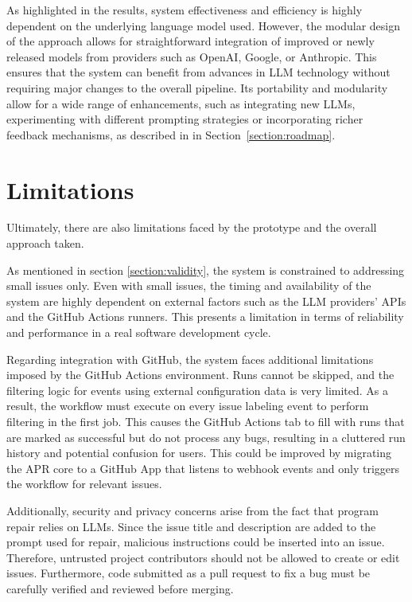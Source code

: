 As highlighted in the results, system effectiveness and efficiency is highly dependent on the underlying language model used. However, the modular design of the approach allows for straightforward integration of improved or newly released models from providers such as OpenAI, Google, or Anthropic. This ensures that the system can benefit from advances in \ac{LLM} technology without requiring major changes to the overall pipeline. Its portability and modularity allow for a wide range of enhancements, such as integrating new \acp{LLM}, experimenting with different prompting strategies or incorporating richer feedback mechanisms, as described in in Section~\ref{section:roadmap}.

\section{Limitations}
Ultimately, there are also limitations faced by the prototype and the overall approach taken.

As mentioned in section \ref{section:validity}, the system is constrained to addressing small issues only. Even with small issues, the timing and availability of the system are highly dependent on external factors such as the \ac{LLM} providers' APIs and the GitHub Actions runners. This presents a limitation in terms of reliability and performance in a real software development cycle.

Regarding integration with GitHub, the system faces additional limitations imposed by the GitHub Actions environment. Runs cannot be skipped, and the filtering logic for events using external configuration data is very limited. As a result, the workflow must execute on every issue labeling event to perform filtering in the first job. This causes the GitHub Actions tab to fill with runs that are marked as successful but do not process any bugs, resulting in a cluttered run history and potential confusion for users. This could be improved by migrating the APR core to a GitHub App that listens to webhook events and only triggers the workflow for relevant issues.

Additionally, security and privacy concerns arise from the fact that program repair relies on \acp{LLM}. Since the issue title and description are added to the prompt used for repair, malicious instructions could be inserted into an issue. Therefore, untrusted project contributors should not be allowed to create or edit issues. Furthermore, code submitted as a pull request to fix a bug must be carefully verified and reviewed before merging.

